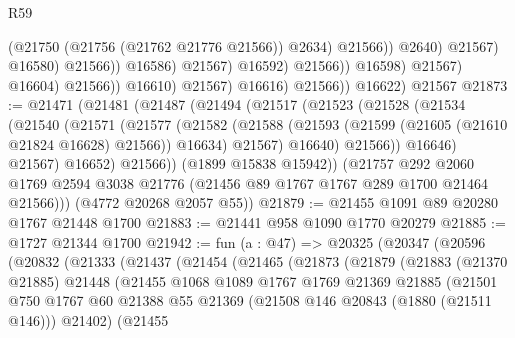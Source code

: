 \begin{lexlean}{R59}
\begin{coremodule}
                                                  (@21750 (@21756 (@21762 @21776 @21566)) @2634)
                                                  @21566))
                                              @2640)
                                            @21567)
                                          @16580)
                                        @21566))
                                    @16586)
                                  @21567)
                                @16592)
                              @21566))
                          @16598)
                        @21567)
                      @16604)
                    @21566))
                @16610)
              @21567)
            @16616)
          @21566))
      @16622)
    @21567
@21873 := @21471
    (@21481
      (@21487
        (@21494
          (@21517
            (@21523
              (@21528
                (@21534
                  (@21540
                    (@21571
                      (@21577
                        (@21582
                          (@21588
                            (@21593 (@21599 (@21605 (@21610 @21824 @16628) @21566)) @16634)
                            @21567)
                          @16640)
                        @21566))
                    @16646)
                  @21567)
                @16652)
              @21566))
          (@1899 @15838 @15942))
        (@21757
          @292
          @2060
          @1769
          @2594
          @3038
          @21776
          (@21456 @89 @1767 @1767 @289 @1700 @21464 @21566)))
      (@4772 @20268 @2057 @55))
@21879 := @21455 @1091 @89 @20280 @1767 @21448 @1700
@21883 := @21441 @958 @1090 @1770 @20279
@21885 := @1727 @21344 @1700
@21942 := fun (a : @47) =>
  @20325
    (@20347
      (@20596
        (@20832
          (@21333
            (@21437
              (@21454
                (@21465
                  (@21873
                    (@21879
                      (@21883
                        (@21370 @21885)
                        @21448
                        (@21455
                          @1068
                          @1089
                          @1767
                          @1769
                          @21369
                          @21885
                          (@21501
                            @750
                            @1767
                            @60
                            @21388
                            @55
                            @21369
                            (@21508 @146 @20843 (@1880 (@21511 @146)))
                            @21402)
                          (@21455

\end{coremodule}
\end{lexlean}
